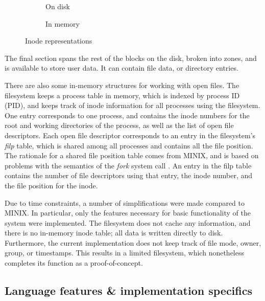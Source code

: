 \begin{figure}
  \centering
  \begin{subfigure}[b]{0.49\textwidth}
    \centering
    \caption{On disk}
    \label{fig:inode on disk}
  \end{subfigure}
  \hfill
  \begin{subfigure}[b]{0.49\textwidth}
    \centering
    \caption{In memory}
    \label{fig:inode in memory}
  \end{subfigure}
  \hfill
  \caption{Inode representations}
  \label{fig:inode representations}
\end{figure}

The final section spans the rest of the blocks on the disk, broken into zones, and is available to store user data.
It can contain file data, or directory entries.

There are also some in-memory structures for working with open files.
The filesystem keeps a process table in memory, which is indexed by process ID (PID), and keeps track of inode information for all processes using the filesystem.
One entry corresponds to one process, and contains the inode numbers for the root and working directories of the process, as well as the list of open file descriptors.
Each open file descriptor corresponds to an entry in the filesystem's \textit{filp} table, which is shared among all processes and contains all the file position.
The rationale for a shared file position table comes from MINIX, and is based on problems with the semantics of the \textit{fork} system call \cite{tanenbaum1997}.
An entry in the filp table contains the number of file descriptors using that entry, the inode number, and the file position for the inode.

Due to time constraints, a number of simplifications were made compared to MINIX.
In particular, only the features necessary for basic functionality of the system were implemented.
The filesystem does not cache any information, and there is no in-memory inode table; all data is written directly to disk.
Furthermore, the current implementation does not keep track of file mode, owner, group, or timestamps.
This results in a limited filesystem, which nonetheless completes its function as a proof-of-concept.

\subsection{Language features \& implementation specifics}
